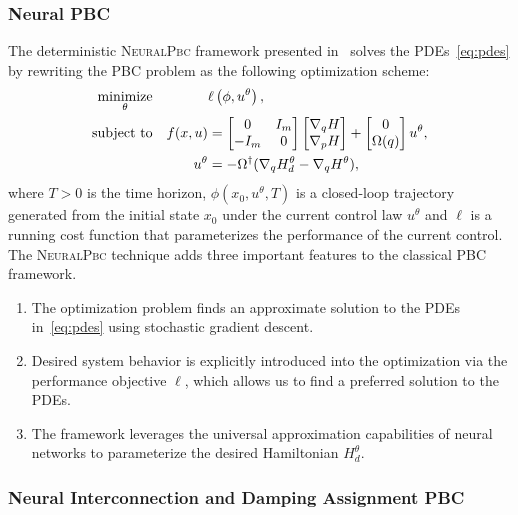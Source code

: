 \subsubsection{Neural PBC}

The deterministic \textsc{NeuralPbc} framework presented in~\cite{ashenafi2022robust}
solves the PDEs~\eqref{eq:pdes} by rewriting the PBC problem as the following 
optimization scheme:
\begin{equation}
  \begin{aligned}
      \underset{\theta}{\textrm{minimize}} 
      & & & \ell \left(\phi,u^{\theta} \right) , \\%
      \textrm{subject to}
      & & f(x, u) &= \bmat{0 & I_m \\ -I_m & 0}\bmat{\nabla_qH \\ \nabla_pH} + \bmat{0 \\ \Omega(q)}u^{\theta}, \\%
      & & u^{\theta} &= -\Omega^{\dagger} (\nabla_q H_d^{\theta} - \nabla_q H^{\theta}),%
  \end{aligned}
  \label{eq:neural_pbc_finite_optim}
\end{equation}
where $T>0$ is the time horizon, $\phi( x_0, u^\theta, T)$ is a closed-loop
trajectory generated from the initial state $x_0$ under the current control law
$u^\theta$ and $\ell$ is a running cost function that parameterizes the
performance of the current control.
%
The \textsc{NeuralPbc} technique adds three important features to the classical 
PBC framework.
\begin{enumerate}
  \item The optimization problem finds an approximate solution to the PDEs
  in~\eqref{eq:pdes} using stochastic gradient descent.
  \item Desired system behavior is explicitly introduced into the optimization
      via the performance objective $\ell$, which allows us to find a
      preferred solution to the PDEs.
  \item The framework leverages the universal approximation capabilities of
  neural networks to parameterize the desired Hamiltonian $H^\theta_d$.
\end{enumerate}

\subsubsection{Neural Interconnection and Damping Assignment PBC}

